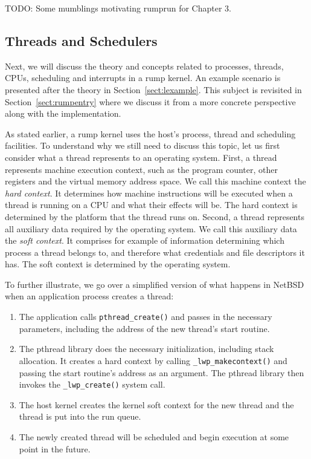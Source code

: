 TODO: Some mumblings motivating rumprun for Chapter 3.


\subsection{Threads and Schedulers}
\label{sect:procmodel}

Next, we will discuss the theory and concepts related to processes,
threads, CPUs, scheduling and interrupts in a rump kernel.  An
example scenario is presented after the theory in
Section~\ref{sect:lexample}.  This subject is revisited in
Section~\ref{sect:rumpentry} where we discuss it from a more concrete
perspective along with the implementation.

As stated earlier, a rump kernel uses the host's process, thread and
scheduling facilities.  To understand why we still need to discuss
this topic, let us first consider what a thread represents to an
operating system.  First, a thread represents machine execution context,
such as the program counter, other registers and the virtual memory
address space.  We call this machine context the \textit{hard context}.
It determines how machine instructions will be executed when a thread
is running on a CPU and what their effects will be.  The hard context
is determined by the platform that the thread runs on.  Second, a
thread represents all auxiliary data required by the operating system.
We call this auxiliary data the \textit{soft context}.  It comprises
for example of information determining which process a thread belongs
to, and \eg therefore what credentials and file descriptors it has.
The soft context is determined by the operating system.

To further illustrate, we go over a simplified version of what happens
in NetBSD when an application process creates a thread:

\begin{enumerate}
\item   The application calls \verb+pthread_create()+ and passes
	in the necessary parameters, including the address of the new
	thread's start routine.

\item   The pthread library does the necessary initialization, including
	stack allocation.  It creates a hard context
	by calling \verb+_lwp_makecontext()+ and passing the
	start routine's address as an argument.  The pthread library then
	invokes the \verb+_lwp_create()+ system call.

\item   The host kernel creates the kernel soft context for the
	new thread and the thread is put into the run queue.

\item	The newly created thread will be scheduled and begin execution
	at some point in the future.
\end{enumerate}

